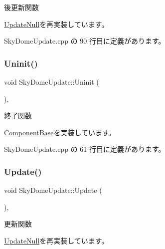 後更新関数 



\mbox{\hyperlink{class_update_null_ac68da1ba7f3fbcae833442bb1c169200}{Update\+Null}}を再実装しています。



 Sky\+Dome\+Update.\+cpp の 90 行目に定義があります。

\mbox{\label{class_sky_dome_update_a54da74ef017a22075ce473abe1345489}} 
\subsubsection{\texorpdfstring{Uninit()}{Uninit()}}
{\footnotesize\ttfamily void Sky\+Dome\+Update\+::\+Uninit (\begin{DoxyParamCaption}{ }\end{DoxyParamCaption})\hspace{0.3cm}{\ttfamily [override]}, {\ttfamily [virtual]}}



終了関数 



\mbox{\hyperlink{class_component_base_a9f42beaf0383d6f629819579cab4de57}{Component\+Base}}を実装しています。



 Sky\+Dome\+Update.\+cpp の 61 行目に定義があります。

\mbox{\label{class_sky_dome_update_ae163cb90e4de561fe1f7b2cb311be331}} 
\subsubsection{\texorpdfstring{Update()}{Update()}}
{\footnotesize\ttfamily void Sky\+Dome\+Update\+::\+Update (\begin{DoxyParamCaption}{ }\end{DoxyParamCaption})\hspace{0.3cm}{\ttfamily [override]}, {\ttfamily [virtual]}}



更新関数 



\mbox{\hyperlink{class_update_null_a692f4f34e4ef35ca286a1d3606fdf473}{Update\+Null}}を再実装しています。



